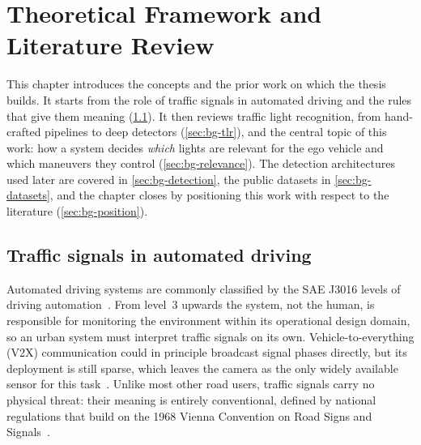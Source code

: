 \chapter{Theoretical Framework and Literature Review}
\label{ch:background}

This chapter introduces the concepts and the prior work on which the thesis builds. It starts from the
role of traffic signals in automated driving and the rules that give them meaning
(\cref{sec:bg-signals}). It then reviews traffic light recognition, from hand-crafted pipelines to
deep detectors (\cref{sec:bg-tlr}), and the central topic of this work: how a system decides
\emph{which} lights are relevant for the ego vehicle and which maneuvers they control
(\cref{sec:bg-relevance}). The detection architectures used later are covered in
\cref{sec:bg-detection}, the public datasets in \cref{sec:bg-datasets}, and the
chapter closes by positioning this work with respect to the literature (\cref{sec:bg-position}).

\section{Traffic signals in automated driving}
\label{sec:bg-signals}

Automated driving systems are commonly classified by the SAE J3016 levels of driving
automation~\cite{sae2021j3016}. From level~3 upwards the system, not the human, is responsible for
monitoring the environment within its operational design domain, so an urban system must interpret
traffic signals on its own. Vehicle-to-everything (V2X) communication could in principle broadcast
signal phases directly, but its deployment is still sparse, which leaves the camera as the only widely
available sensor for this task~\cite{polley2024tldready,polley2025atlas}. Unlike most other road
users, traffic signals carry no physical threat: their meaning is entirely conventional, defined by
national regulations that build on the 1968 Vienna Convention on Road Signs and
Signals~\cite{unece1968vienna}.

